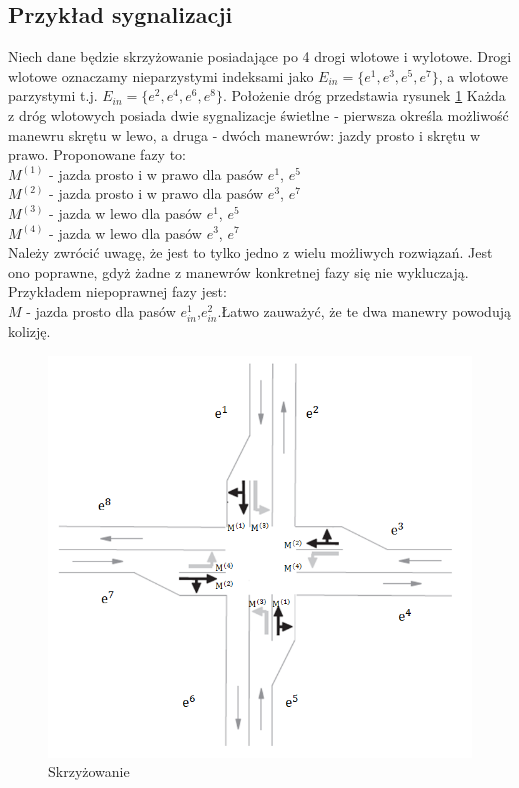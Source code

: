 \documentclass[12pt]{book}
\begin{document}
\subsection{Przykład sygnalizacji}
Niech dane będzie skrzyżowanie posiadające po 4 drogi wlotowe i wylotowe. Drogi wlotowe oznaczamy nieparzystymi indeksami jako $E_{in}=\{e^{1},e^{3},e^{5},e^{7}\}$, a wlotowe parzystymi t.j. $E_{in}=\{e^2,e^4,e^6,e^8\}$. Położenie dróg przedstawia rysunek \ref{fig:skrzyzowanie} Każda z dróg wlotowych posiada dwie sygnalizacje świetlne - pierwsza określa możliwość manewru skrętu w lewo, a druga - dwóch manewrów: jazdy prosto i skrętu w prawo. Proponowane fazy to:\\
$M^{(1)}$ - jazda prosto i w prawo dla pasów $e^1$, $ e^5$ \\
$M^{(2)}$ - jazda prosto i w prawo dla pasów $e^3$, $e^7$\\
$M^{(3)}$ - jazda w lewo dla pasów $e^1$, $e^5$\\
$M^{(4)}$ - jazda w lewo dla pasów $e^3$, $e^7$\\
Należy zwrócić uwagę, że jest to tylko jedno z wielu możliwych rozwiązań. Jest ono poprawne, gdyż żadne z manewrów konkretnej fazy się nie wykluczają. Przykładem niepoprawnej fazy jest: \\
$M$ - jazda prosto dla pasów $e^1_{in}$,$e^2_{in}.$Łatwo zauważyć, że te dwa manewry powodują kolizję.
\begin{figure}[H]
  \centering
    \includegraphics[width=14cm]{skrz_bez_in_out}
 \caption{Skrzyżowanie}
 \label{fig:skrzyzowanie}
\end{figure}
\end{document}
